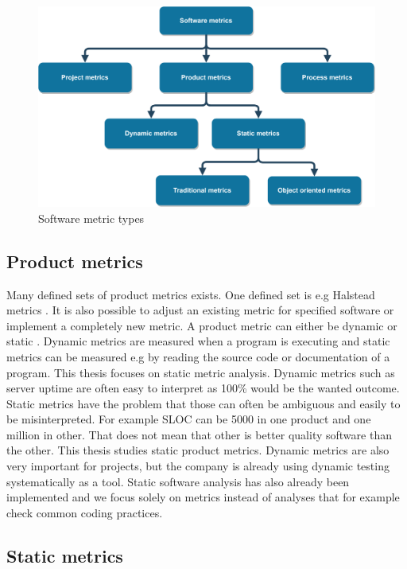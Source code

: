 \begin{figure}[t!]
\centering
\includegraphics[scale=0.05]{metrictree.png}
\caption{Software metric types}
\label{fig:metrictree}
\end{figure}

\subsection{Product metrics}

Many defined sets of product metrics exists. One defined set is e.g Halstead metrics \cite{al2005analysis}. It is also possible to adjust an existing metric for specified software or implement a completely new metric. A product metric can either be dynamic or static \cite{sommerville2011software}. Dynamic metrics are measured when a program is executing and static metrics can be measured e.g by reading the source code or documentation of a program. This thesis focuses on static metric analysis. Dynamic metrics such as server uptime are often easy to interpret as 100\% would be the wanted outcome. Static metrics have the problem that those can often be ambiguous and easily to be misinterpreted. For example SLOC can be 5000 in one product and one million in other. That does not mean that other is better quality software than the other. This thesis studies static product metrics. Dynamic metrics are also very important for projects, but the company is already using dynamic testing systematically as a tool. Static software analysis has also already been implemented and we focus solely on metrics instead of analyses that for example check common coding practices.

\subsection{Static metrics}

